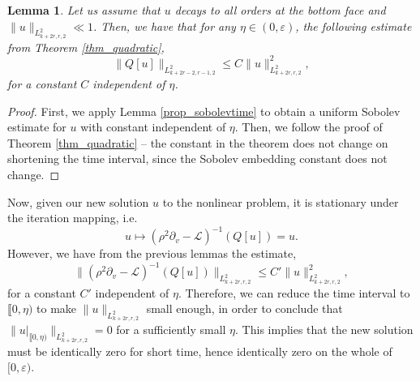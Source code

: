 \documentclass[10pt, a4paper]{article}
\theoremstyle{plain}%
\newtheorem{lem}[theorem]{Lemma}
\theoremstyle{definition}
\numberwithin{figure}{section}
\numberwithin{equation}{section}
\newcommand{\pa}{\partial}
\newcommand{\ep}{\varepsilon}
\newcommand{\cL}{\mathcal{L}}
\begin{document}
\begin{lem}
	Let us assume that $u$ decays to all orders at the bottom face and $\|u\|_{L^2_{k+2r,r,2}} \ll 1$. Then, we have that for any $\eta \in (0,\ep)$, the following estimate from Theorem \ref{thm_quadratic}, \[
	\|Q[u]\|_{L^2_{k+2r-2,r-1,2}}\leq C\|u\|^2_{L^2_{k+2r,r,2}},
	\]
	for a constant $C$ independent of $\eta$.
\end{lem}
\begin{proof}
	First, we apply Lemma \ref{prop_sobolevtime} to obtain a uniform Sobolev estimate for $u$ with constant independent of $\eta$. Then, we follow the proof of Theorem \ref{thm_quadratic} -- the constant in the theorem does not change on shortening the time interval, since the Sobolev embedding constant does not change.
\end{proof}
Now, given our new solution $u$ to the nonlinear problem, it is stationary under the iteration mapping, i.e.\ \[
u \mapsto (\rho^2\pa_v-\cL)^{-1}(Q[u]) = u.
\]
However, we have from the previous lemmas the estimate, \[
\|(\rho^2\pa_v-\cL)^{-1}(Q[u])\|_{L^2_{k+2r,r,2}} \leq C'\|u\|^2_{L^2_{k+2r,r,2}},
\]
for a constant $C'$ independent of $\eta$. Therefore, we can reduce the time interval to $\llbracket0,\eta)$ to make $\|u\|_{L^2_{k+2r,r,2}}$ small enough, in order to conclude that $\|u|_{\llbracket0,\eta)}\|_{L^2_{k+2r,r,2}} =0$ for a sufficiently small $\eta$. This implies that the new solution must be identically zero for short time, hence identically zero on the whole of $[0,\ep)$.
\end{document}

